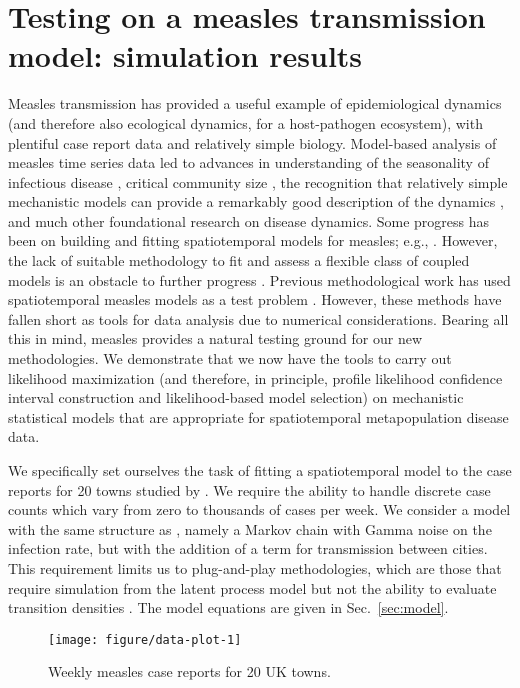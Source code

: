 \documentclass[12pt]{article}\usepackage[]{graphicx}\usepackage[]{xcolor}
\newenvironment{knitrout}{}{} %
\begin{document}
\section{Testing {\ibpf} on a measles transmission model: simulation results}
\label{sec:sim}

Measles transmission has provided a useful example of epidemiological dynamics (and therefore also ecological dynamics, for a host-pathogen ecosystem), with plentiful case report data and relatively simple biology.
Model-based analysis of measles time series data led to advances in understanding of the seasonality of infectious disease \citep{fine82}, critical community size \citep{bartlett57}, the recognition that relatively simple mechanistic models can provide a remarkably good description of the dynamics \citep{earn00}, and much other foundational research on disease dynamics.
Some progress has been on building and fitting spatiotemporal models for measles; e.g., \citet{xia04,eggo11,bjornstad19,becker20}.
However, the lack of suitable methodology to fit and assess a flexible class of coupled models is an obstacle to further progress \citep{becker20}.
Previous methodological work has used spatiotemporal measles models as a test problem \citep{park20,ionides21}.
However, these methods have fallen short as tools for data analysis due to numerical considerations.
Bearing all this in mind, measles provides a natural testing ground for our new methodologies.
We demonstrate that we now have the tools to carry out likelihood maximization (and therefore, in principle, profile likelihood confidence interval construction and likelihood-based model selection) on mechanistic statistical models that are appropriate for spatiotemporal metapopulation disease data.

We specifically set ourselves the task of fitting a spatiotemporal model to the case reports for 20 towns studied by \citet{he10}.
We require the ability to handle discrete case counts which vary from zero to thousands of cases per week.
We consider a model with the same structure as \citet{he10}, namely a Markov chain with Gamma noise on the infection rate, but with the addition of a term for transmission between cities.
This requirement limits us to plug-and-play methodologies, which are those that require simulation from the latent process model but not the ability to  evaluate transition densities \citep{breto09,he10}.
The model equations are given in Sec.~\ref{sec:model}.

\begin{knitrout}
\color{fgcolor}\begin{figure}

\texttt{[image: figure/data-plot-1]} \hfill{}

\caption[Weekly measles case reports for 20 UK towns]{Weekly measles case reports for 20 UK towns.}\label{fig:data-plot}
\end{figure}

\end{knitrout}
\end{document}
